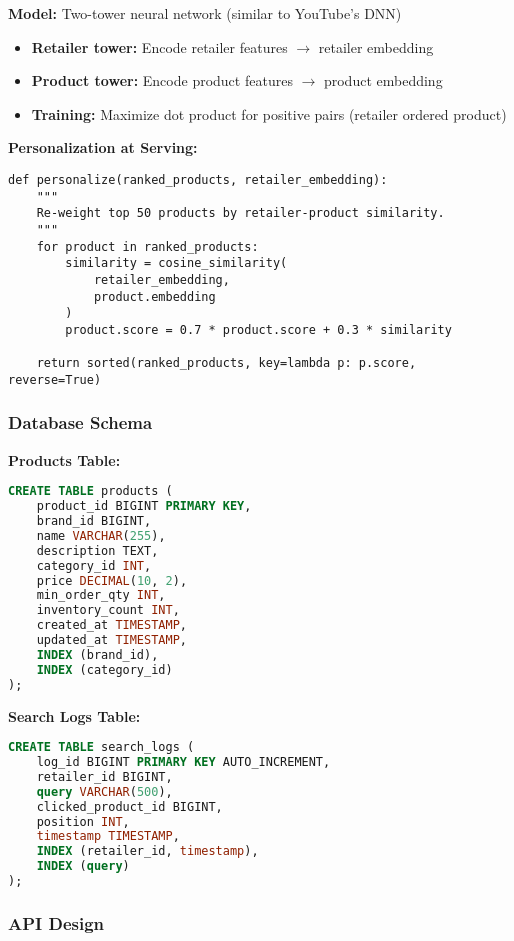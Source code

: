 \documentclass[11pt,letterpaper]{article}
\begin{document}
\textbf{Model:} Two-tower neural network (similar to YouTube's DNN)
\begin{itemize}
    \item \textbf{Retailer tower:} Encode retailer features $\rightarrow$ retailer embedding
    \item \textbf{Product tower:} Encode product features $\rightarrow$ product embedding
    \item \textbf{Training:} Maximize dot product for positive pairs (retailer ordered product)
\end{itemize}

\textbf{Personalization at Serving:}
\begin{lstlisting}
def personalize(ranked_products, retailer_embedding):
    """
    Re-weight top 50 products by retailer-product similarity.
    """
    for product in ranked_products:
        similarity = cosine_similarity(
            retailer_embedding,
            product.embedding
        )
        product.score = 0.7 * product.score + 0.3 * similarity

    return sorted(ranked_products, key=lambda p: p.score, reverse=True)
\end{lstlisting}

\subsubsection{Database Schema}

\textbf{Products Table:}
\begin{lstlisting}[language=SQL]
CREATE TABLE products (
    product_id BIGINT PRIMARY KEY,
    brand_id BIGINT,
    name VARCHAR(255),
    description TEXT,
    category_id INT,
    price DECIMAL(10, 2),
    min_order_qty INT,
    inventory_count INT,
    created_at TIMESTAMP,
    updated_at TIMESTAMP,
    INDEX (brand_id),
    INDEX (category_id)
);
\end{lstlisting}

\textbf{Search Logs Table:}
\begin{lstlisting}[language=SQL]
CREATE TABLE search_logs (
    log_id BIGINT PRIMARY KEY AUTO_INCREMENT,
    retailer_id BIGINT,
    query VARCHAR(500),
    clicked_product_id BIGINT,
    position INT,
    timestamp TIMESTAMP,
    INDEX (retailer_id, timestamp),
    INDEX (query)
);
\end{lstlisting}

\subsubsection{API Design}
\end{document}
